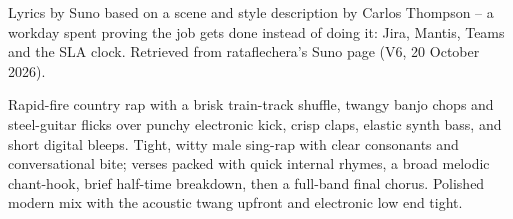 
\begin{notes}
Lyrics by Suno based on a scene and style description by Carlos Thompson -- a workday spent proving the job gets done instead of doing it: Jira, Mantis, Teams and the SLA clock. Retrieved from rataflechera's Suno page (V6, 20 October 2026).
\end{notes}
\begin{style}
Rapid-fire country rap with a brisk train-track shuffle, twangy banjo chops and steel-guitar flicks over punchy electronic kick, crisp claps, elastic synth bass, and short digital bleeps. Tight, witty male sing-rap with clear consonants and conversational bite; verses packed with quick internal rhymes, a broad melodic chant-hook, brief half-time breakdown, then a full-band final chorus. Polished modern mix with the acoustic twang upfront and electronic low end tight.
\end{style}
